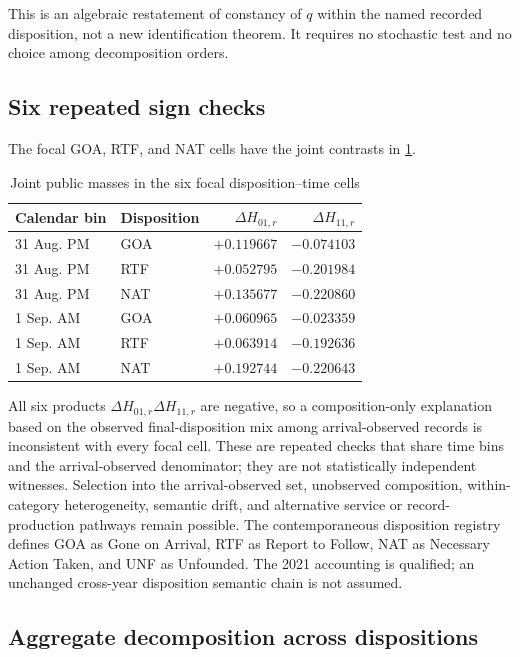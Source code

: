 \documentclass[11pt]{article}
\begin{document}
This is an algebraic restatement of constancy of $q$ within the named recorded disposition, not a new identification theorem. It requires no stochastic test and no choice among decomposition orders.

\subsection{Six repeated sign checks}

The focal GOA, RTF, and NAT cells have the joint contrasts in \cref{tab:jointsigns}.

\begin{table}[H]
\centering
\caption{Joint public masses in the six focal disposition--time cells}
\label{tab:jointsigns}
\begin{tabular}{@{}llrr@{}}
\toprule
Calendar bin & Disposition & $\Delta H_{01,r}$ & $\Delta H_{11,r}$ \\
\midrule
31 Aug. PM & GOA & $+0.119667$ & $-0.074103$ \\
31 Aug. PM & RTF & $+0.052795$ & $-0.201984$ \\
31 Aug. PM & NAT & $+0.135677$ & $-0.220860$ \\
1 Sep. AM & GOA & $+0.060965$ & $-0.023359$ \\
1 Sep. AM & RTF & $+0.063914$ & $-0.192636$ \\
1 Sep. AM & NAT & $+0.192744$ & $-0.220643$ \\
\bottomrule
\end{tabular}
\end{table}

All six products $\Delta H_{01,r}\Delta H_{11,r}$ are negative, so a composition-only explanation based on the observed final-disposition mix among arrival-observed records is inconsistent with every focal cell. These are repeated checks that share time bins and the arrival-observed denominator; they are not statistically independent witnesses. Selection into the arrival-observed set, unobserved composition, within-category heterogeneity, semantic drift, and alternative service or record-production pathways remain possible. The contemporaneous disposition registry defines GOA as Gone on Arrival, RTF as Report to Follow, NAT as Necessary Action Taken, and UNF as Unfounded. The 2021 accounting is qualified; an unchanged cross-year disposition semantic chain is not assumed.

\subsection{Aggregate decomposition across dispositions}
\end{document}
